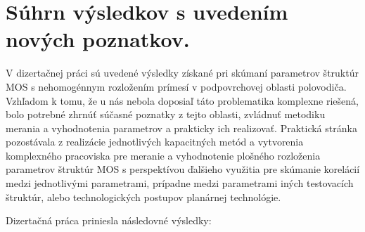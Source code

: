 \chapter{Súhrn výsledkov s uvedením nových poznatkov.}
\label{Chapter8}

V dizertačnej práci sú uvedené výsledky získané pri skúmaní parametrov
štruktúr MOS s nehomogénnym rozložením prímesí v podpovrchovej oblasti
polovodiča. Vzhľadom k tomu, že u nás nebola doposiaľ táto
problematika komplexne riešená, bolo potrebné zhrnúť súčasné poznatky
z tejto oblasti, zvládnuť metodiku merania a vyhodnotenia parametrov a
prakticky ich realizovať. Praktická stránka pozostávala z realizácie
jednotlivých kapacitných metód a vytvorenia komplexného pracoviska pre
meranie a vyhodnotenie plošného rozloženia parametrov štruktúr MOS s
perspektívou ďalšieho využitia pre skúmanie korelácií medzi
jednotlivými parametrami, prípadne medzi parametrami iných testovacích
štruktúr, alebo technologických postupov planárnej technológie.

Dizertačná práca priniesla následovné výsledky:

